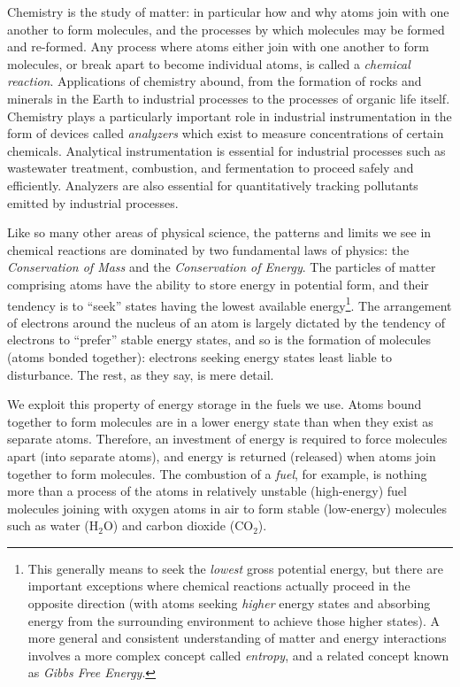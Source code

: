 \filbreak

Chemistry is the study of matter: in particular how and why atoms join with one another to form molecules, and the processes by which molecules may be formed and re-formed.  Any process where atoms either join with one another to form molecules, or break apart to become individual atoms, is called a \textit{chemical reaction}.  Applications of chemistry abound, from the formation of rocks and minerals in the Earth to industrial processes to the processes of organic life itself.  Chemistry plays a particularly important role in industrial instrumentation in the form of devices called \textit{analyzers} which exist to measure concentrations of certain chemicals.  Analytical instrumentation is essential for industrial processes such as wastewater treatment, combustion, and fermentation to proceed safely and efficiently.  Analyzers are also essential for quantitatively tracking pollutants emitted by industrial processes.

Like so many other areas of physical science, the patterns and limits we see in chemical reactions are dominated by two fundamental laws of physics: the \textit{Conservation of Mass} and the \textit{Conservation of Energy}.  The particles of matter comprising atoms have the ability to store energy in potential form, and their tendency is to ``seek'' states having the lowest available energy\footnote{This generally means to seek the \textit{lowest} gross potential energy, but there are important exceptions where chemical reactions actually proceed in the opposite direction (with atoms seeking \textit{higher} energy states and absorbing energy from the surrounding environment to achieve those higher states).  A more general and consistent understanding of matter and energy interactions involves a more complex concept called \textit{entropy}, and a related concept known as \textit{Gibbs Free Energy}.}.  The arrangement of electrons around the nucleus of an atom is largely dictated by the tendency of electrons to ``prefer'' stable energy states, and so is the formation of molecules (atoms bonded together): electrons seeking energy states least liable to disturbance.  The rest, as they say, is mere detail.          

\vskip 10pt

We exploit this property of energy storage in the fuels we use.  Atoms bound together to form molecules are in a lower energy state than when they exist as separate atoms.  Therefore, an investment of energy is required to force molecules apart (into separate atoms), and energy is returned (released) when atoms join together to form molecules.  The combustion of a \textit{fuel}, for example, is nothing more than a process of the atoms in relatively unstable (high-energy) fuel molecules joining with oxygen atoms in air to form stable (low-energy) molecules such as water (H$_{2}$O) and carbon dioxide (CO$_{2}$).

